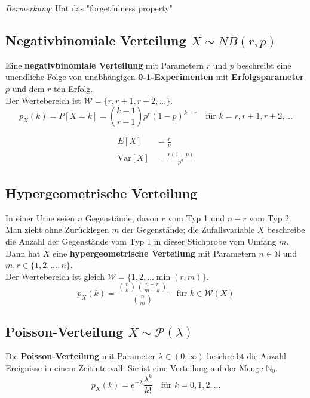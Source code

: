 \documentclass[11pt]{article}
\newcommand{\Var}{\text{Var}}
\begin{document}
\emph{Bermerkung:} Hat das "forgetfulness property"

\subsection{Negativbinomiale Verteilung $X \sim NB(r,p)$}

Eine \textbf{negativbinomiale Verteilung} mit Parametern $r$ und $p$ beschreibt eine unendliche Folge von unabh{\"a}ngigen \textbf{0-1-Experimenten} mit \textbf{Erfolgsparameter} $p$ und dem $r$-ten Erfolg. \\
Der Wertebereich ist $\mathcal{W} = \{r, r+1, r+2,...\}$.
\begin{equation*}
	p_X(k) = P[X = k] = \binom{k-1}{r-1}p^r(1-p)^{k-r} \quad\text{f{\"u}r } k = r, r+1, r+2, ...
\end{equation*}

\begin{equation*}
\begin{split}
	E[X] & = \frac{r}{p} \\
	\Var[X] & = \frac{r(1-p)}{p^2}
\end{split}
\end{equation*}

\subsection{Hypergeometrische Verteilung}

In einer Urne seien $n$ Gegenst{\"a}nde, davon $r$ vom Typ 1 und $n -r$ vom Typ 2. Man zieht ohne Zur{\"u}cklegen $m$ der Gegenst{\"a}nde; die Zufallsvariable $X$ beschreibe die Anzahl der Gegenst{\"a}nde vom Typ 1 in dieser Stichprobe vom Umfang $m$. Dann hat $X$ eine \textbf{hypergeometrische Verteilung} mit Parametern $n \in \mathbb{N}$ und $m,r \in \{1, 2, ..., n\}$. \\
Der Wertebereich ist gleich $\mathcal{W} = \{1, 2,... \min(r, m)\}$.
\begin{equation*}
	p_X(k) = \frac{\binom{r}{k}\binom{n-r}{m-k}}{\binom{n}{m}} \quad \text{f{\"u}r } k \in \mathcal{W}(X)
\end{equation*}

\subsection{Poisson-Verteilung $X \sim \mathcal{P}(\lambda)$}

Die \textbf{Poisson-Verteilung} mit Parameter $\lambda \in (0, \infty)$ beschreibt die Anzahl Ereignisse in einem Zeitintervall. Sie ist eine Verteilung auf der Menge $\mathbb{N}_0$.
\begin{equation*}
	p_X(k) = e^{-\lambda}\frac{\lambda^k}{k!}\quad\text{f{\"u}r } k = 0, 1, 2,...
\end{equation*}
\end{document}
